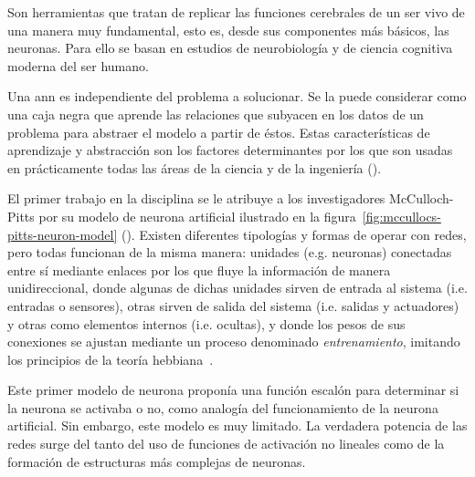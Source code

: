 Son herramientas que tratan de replicar las funciones cerebrales de un ser vivo de una manera muy fundamental, esto es, desde sus componentes más básicos, las neuronas. Para ello se basan en estudios de neurobiología y de ciencia cognitiva moderna del ser humano.

Una \Acrfull{ann} es independiente del problema a solucionar. Se la puede considerar como una caja negra que aprende las relaciones que subyacen en los datos de un problema para abstraer el modelo a partir de éstos. Estas características de aprendizaje y abstracción son los factores determinantes por los que son usadas en prácticamente todas las áreas de la ciencia y de la ingeniería (\cite{Du2006}).

El primer trabajo en la disciplina se le atribuye a  los investigadores McCulloch-Pitts por su modelo de neurona artificial ilustrado en la figura~\ref{fig:mccullocs-pitts-neuron-model} (\cite{McCulloch1943}). Existen diferentes tipologías y formas de operar con redes, pero todas funcionan de la misma manera: unidades (e.g. neuronas) conectadas entre sí mediante enlaces por los que fluye la información de manera unidireccional, donde algunas de dichas unidades sirven de entrada al sistema (i.e. entradas o sensores), otras sirven de salida del sistema (i.e. salidas y actuadores) y otras como elementos internos (i.e. ocultas), y donde los pesos de sus conexiones se ajustan mediante un proceso denominado \textit{entrenamiento}, imitando los principios de la teoría hebbiana~\cite{hebb19680}.

Este primer modelo de neurona proponía una función escalón para determinar si la neurona se activaba o no, como analogía del funcionamiento de la neurona artificial. Sin embargo, este modelo es muy limitado. La verdadera potencia de las redes surge del tanto del uso de funciones de activación no lineales como de la formación de estructuras más complejas de neuronas.

